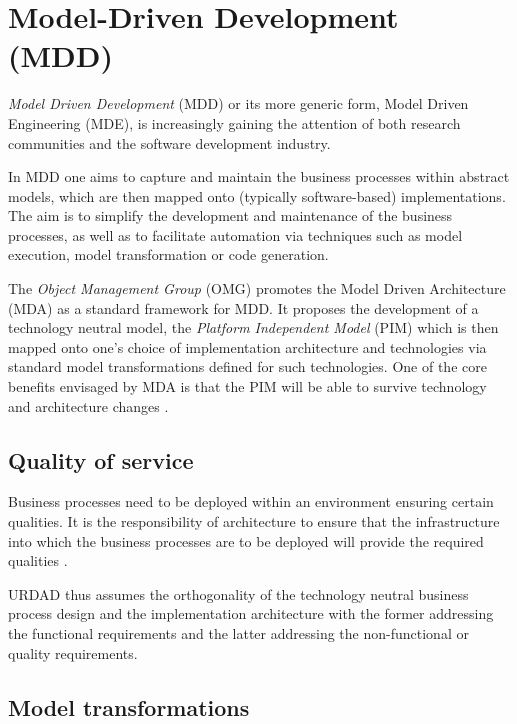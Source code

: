 \section{Model-Driven Development (MDD)}


{\em Model Driven Development} (MDD) or its more generic form, Model Driven
Engineering (MDE),
\cite{selic:pragmaticsOfModelDrivenDevelopment,schmidt:modelDrivenEngineering, france:mddUsingUml2}
is increasingly gaining the attention of both research communities and the software development industry.

In MDD one aims to capture and maintain the business processes within abstract models,
which are then mapped onto (typically software-based) implementations. The
aim is to simplify the development and maintenance of the business processes,
as well as to facilitate automation via techniques such as model execution, model transformation 
or code generation.

The {\em Object Management Group} (OMG) promotes the Model Driven Architecture
(MDA) \cite{pastor:mdaInPractice,siegel:developingInMDA,frankel:enterpriseMDA,
stahl:mdsd}
as a standard framework for MDD. It proposes the development of a
technology neutral model, the {\em Platform Independent Model} (PIM) which is
then mapped onto one's choice of implementation architecture and technologies
via standard model transformations defined for such technologies. One of the
core benefits envisaged by MDA is that the PIM will be able to survive
technology and architecture changes \cite{siegel:developingInMDA}.

\subsection{Quality of service}

Business processes need to be deployed within an environment ensuring certain qualities.
It is the responsibility of architecture to ensure that the infrastructure into which
the business processes are to be deployed will provide the required qualities
\cite{bass:softwareArchitecture}.

URDAD thus assumes the orthogonality of the technology neutral business process design and
the implementation architecture with the former addressing the functional requirements and
the latter addressing the non-functional or quality requirements.

\subsection{Model transformations}

